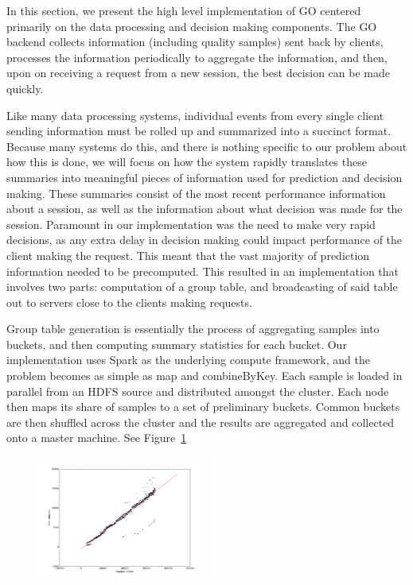 In this section, we present the high level implementation of GO centered primarily on the data processing and decision making components. The GO backend collects information (including quality samples) sent back by clients, processes the information periodically to aggregate the information, and then, upon on receiving a request from a new session, the best decision can be made quickly.

Like many data processing systems, individual events from every single client sending information must be rolled up and summarized into a succinct format. Because many systems do this, and there is nothing specific to our problem about how this is done, we will focus on how the system rapidly translates these summaries into meaningful pieces of information used for prediction and decision making. These summaries consist of the most recent performance information about a session, as well as the information about what decision was made for the session. Paramount in our implementation was the need to make very rapid decisions, as any extra delay in decision making could impact performance of the client making the request. This meant that the vast majority of prediction information needed to be precomputed. This resulted in an implementation that involves two parts: computation of a group table, and broadcasting of said table out to servers close to the clients making requests.

 Group table generation is essentially the process of aggregating samples into buckets, and then computing summary statistics for each bucket.  Our implementation uses Spark as the underlying compute framework, and the problem becomes as simple as map and combineByKey. Each sample is loaded in parallel from an HDFS source and distributed amongst the cluster. Each node then maps its share of samples to a set of preliminary buckets. Common buckets are then shuffled across the cluster and the results are aggregated and collected onto a master machine. See Figure~\ref{fig:computing-scale}

\begin{figure}[h!]
\centering
 \includegraphics[width=0.5\textwidth] {figures/fetch_time_scale.pdf}
\label{fig:computing-scale}
\end{figure}


